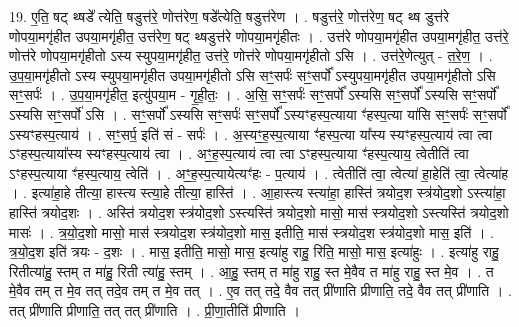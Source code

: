 \documentclass[17pt]{extarticle}
\begin{document}
19. ए॒ति॒ षट् थ्षडे᳚ त्येति॒ षडुत्त॑रे॒ णोत्त॑रेण॒ षडे᳚त्येति॒ षडुत्त॑रेण । . षडुत्त॑रे॒ णोत्त॑रेण॒ षट् थ्ष डुत्त॑रे णोपया॒मगृ॑हीत उपया॒मगृ॑हीत॒ उत्त॑रेण॒ षट् थ्षडुत्त॑रे णोपया॒मगृ॑हीतः । . उत्त॑रे णोपया॒मगृ॑हीत उपया॒मगृ॑हीत॒ उत्त॑रे॒ णोत्त॑रे णोपया॒मगृ॑हीतो ऽस्य स्युपया॒मगृ॑हीत॒ उत्त॑रे॒ णोत्त॑रे णोपया॒मगृ॑हीतो ऽसि । . उत्त॑रे॒णेत्युत् - त॒रे॒ण॒ । . उ॒प॒या॒मगृ॑हीतो ऽस्य स्युपया॒मगृ॑हीत उपया॒मगृ॑हीतो ऽसि सꣳ॒॒सर्पः॑ सꣳ॒॒सर्पो᳚ ऽस्युपया॒मगृ॑हीत उपया॒मगृ॑हीतो ऽसि सꣳ॒॒सर्पः॑ । . उ॒प॒या॒मगृ॑हीत॒ इत्यु॑पया॒म - गृ॒ही॒तः॒ । . अ॒सि॒ सꣳ॒॒सर्पः॑ सꣳ॒॒सर्पो᳚ ऽस्यसि सꣳ॒॒सर्पो᳚ ऽस्यसि सꣳ॒॒सर्पो᳚ ऽस्यसि सꣳ॒॒सर्पो॑ ऽसि । . सꣳ॒॒सर्पो᳚ ऽस्यसि सꣳ॒॒सर्पः॑ सꣳ॒॒सर्पो᳚ ऽस्यꣳहस्प॒त्याया ꣳ॑हस्प॒त्या या॑सि सꣳ॒॒सर्पः॑ सꣳ॒॒सर्पो᳚ ऽस्यꣳहस्प॒त्याय॑ । . सꣳ॒॒सर्प॒ इति॑ सं - सर्पः॑ । . अ॒स्यꣳ॒॒ह॒स्प॒त्याया ꣳ॑हस्प॒त्या या᳚स्य स्यꣳहस्प॒त्याय॑ त्वा त्वा ऽꣳहस्प॒त्याया᳚स्य स्यꣳहस्प॒त्याय॑ त्वा । . अꣳ॒॒ह॒स्प॒त्याय॑ त्वा त्वा ऽꣳहस्प॒त्याया ꣳ॑हस्प॒त्याय॒ त्वेतीति॑ त्वा ऽꣳहस्प॒त्याया ꣳ॑हस्प॒त्याय॒ त्वेति॑ । . अꣳ॒॒ह॒स्प॒त्यायेत्यꣳ॑हः - प॒त्याय॑ । . त्वेतीति॑ त्वा॒ त्वेत्या॑ हा॒हेति॑ त्वा॒ त्वेत्या॑ह । . इत्या॑हा॒हे तीत्या॒ हास्त्य स्त्या॒हे तीत्या॒ हास्ति॑ । . आ॒हास्त्य स्त्या॑हा॒ हास्ति॑ त्रयोद॒श स्त्र॑योद॒शो ऽस्त्या॑हा॒ हास्ति॑ त्रयोद॒शः । . अस्ति॑ त्रयोद॒श स्त्र॑योद॒शो ऽस्त्यस्ति॑ त्रयोद॒शो मासो॒ मास॑ स्त्रयोद॒शो ऽस्त्यस्ति॑ त्रयोद॒शो मासः॑ । . त्र॒यो॒द॒शो मासो॒ मास॑ स्त्रयोद॒श स्त्र॑योद॒शो मास॒ इतीति॒ मास॑ स्त्रयोद॒श स्त्र॑योद॒शो मास॒ इति॑ । . त्र॒यो॒द॒श इति॑ त्रयः - द॒शः । . मास॒ इतीति॒ मासो॒ मास॒ इत्या॑हु राहु॒ रिति॒ मासो॒ मास॒ इत्या॑हुः । . इत्या॑हु राहु॒ रितीत्या॑हु॒ स्तम् त मा॑हु॒ रिती त्या॑हु॒ स्तम् । . आ॒हु॒ स्तम् त मा॑हु राहु॒ स्त मे॒वैव त मा॑हु राहु॒ स्त मे॒व । . त मे॒वैव तम् त मे॒व तत् तदे॒व तम् त मे॒व तत् । . ए॒व तत् तदे॒ वैव तत् प्री॑णाति प्रीणाति॒ तदे॒ वैव तत् प्री॑णाति । . तत् प्री॑णाति प्रीणाति॒ तत् तत् प्री॑णाति । . प्री॒णा॒तीति॑ प्रीणाति । \newline
\pagebreak
{}
\end{document}
